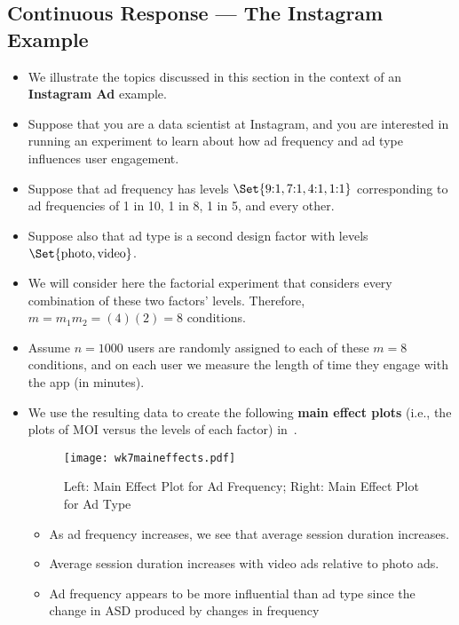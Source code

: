 \subsection{Continuous Response --- The Instagram Example}
\begin{itemize}
      \item We illustrate the topics discussed in this section in the context of an \textbf{Instagram Ad} example.
      \item Suppose that you are a data scientist at Instagram, and you are interested in running an experiment
            to learn about how ad frequency and ad type influences user engagement.
      \item Suppose that ad frequency has levels $ \Set{\text{9:1},\text{7:1},\text{4:1},\text{1:1}} $ corresponding to ad frequencies of
            1 in 10, 1 in 8, 1 in 5, and every other.
      \item Suppose also that ad type is a second design factor with levels $ \Set{\text{photo},\text{video}} $.
      \item We will consider here the factorial experiment that considers every combination of these two factors'
            levels. Therefore, $ m=m_1m_2=(4)(2)=8 $ conditions.
      \item Assume $ n=1000 $ users are randomly assigned to each of these $ m=8 $ conditions, and on each user we measure
            the length of time they engage with the app (in minutes).
      \item We use the resulting data to create the following \textbf{main effect plots} (i.e., the plots of MOI versus
            the levels of each factor) in~.
            \begin{figure}[!htbp]
                  \centering
                  \texttt{[image: wk7maineffects.pdf]}
                  \caption{Left: Main Effect Plot for Ad Frequency; Right: Main Effect Plot for Ad Type}\label{wk7eff}
            \end{figure}
            \begin{itemize}
                  \item As ad frequency increases, we see that average session duration increases.
                  \item Average session duration increases with video ads relative to photo ads.
                  \item Ad frequency appears to be more influential than ad type since the change in ASD produced by changes in frequency

\end{itemize}
\end{itemize}
